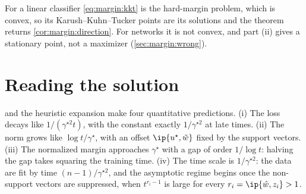 \begin{refsection}
For a linear classifier \eqref{eq:margin:kkt} is the hard-margin problem, which is convex, so its Karush--Kuhn--Tucker points are its solutions and the theorem returns \cref{cor:margin:direction}. For networks it is not convex, and part (ii) gives a stationary point, not a maximizer (\cref{sec:margin:wrong}).

\section{Reading the solution}\label{sec:margin:reading}

 and the heuristic expansion make four quantitative predictions. (i) The loss decays like $1/(\gamma^{\star2}t)$, with the constant exactly $1/\gamma^{\star2}$ at late times. (ii) The norm grows like $\log t/\gamma^\star$, with an offset $\ip{\marginu,\marginwt}$ fixed by the support vectors. (iii) The normalized margin approaches $\gamma^\star$ with a gap of order $1/\log t$: halving the gap takes squaring the training time. (iv) The time scale is $1/\gamma^{\star2}$: the data are fit by time $(n-1)/\gamma^{\star2}$, and the asymptotic regime begins once the non-support vectors are suppressed, when $t^{r_i-1}$ is large for every $r_i=\ip{\marginwhat,z_i}>1$.


\end{refsection}
